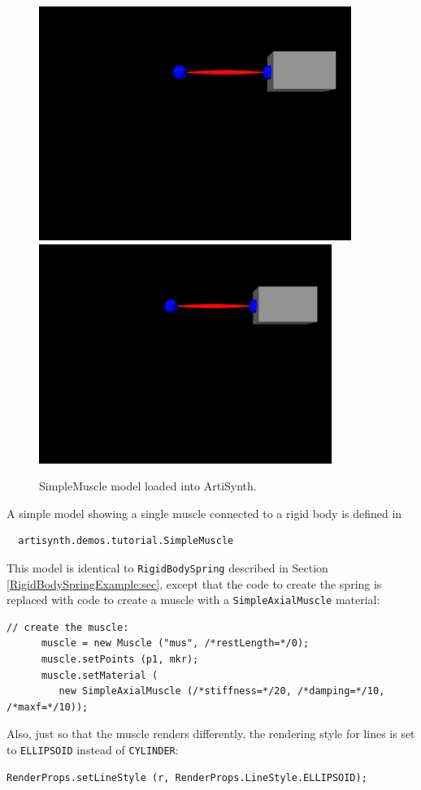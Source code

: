 \begin{figure}[h]
\begin{center}
\iflatexml
 \includegraphics[]{images/SimpleMuscle}
\else
 \includegraphics[width=3.75in]{images/SimpleMuscle}
\fi
\end{center}
\caption{SimpleMuscle model loaded into ArtiSynth.}
\label{SimpleMuscle:fig}
\end{figure}

A simple model showing a single muscle connected to a rigid
body is defined in
%
\begin{verbatim}
  artisynth.demos.tutorial.SimpleMuscle
\end{verbatim}
%

This model is identical to {\tt RigidBodySpring} described in Section
\ref{RigidBodySpringExample:sec}, except that the code to create
the spring is replaced with code to create a muscle
with a {\tt SimpleAxialMuscle} material:
%
\begin{lstlisting}[]
      // create the muscle:      
      muscle = new Muscle ("mus", /*restLength=*/0);
      muscle.setPoints (p1, mkr);
      muscle.setMaterial (
         new SimpleAxialMuscle (/*stiffness=*/20, /*damping=*/10, /*maxf=*/10));
\end{lstlisting}
%
Also, just so that the muscle renders differently, the rendering style
for lines is set to {\tt ELLIPSOID} instead of {\tt CYLINDER}:
%
\begin{lstlisting}[]
      RenderProps.setLineStyle (r, RenderProps.LineStyle.ELLIPSOID);
\end{lstlisting}
%

